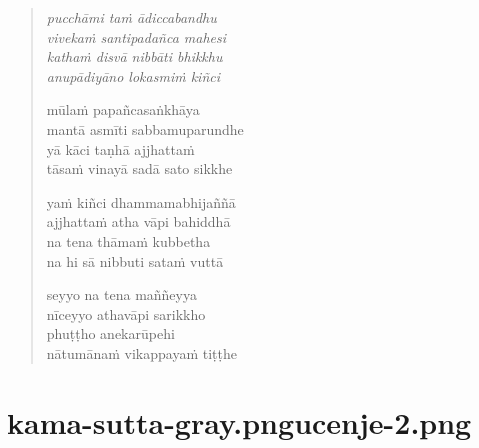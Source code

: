 

\cleartoverso

\vspace*{30mm}

\begin{verse}

\emph{pucchāmi taṁ ādiccabandhu\\
vivekaṁ santipadañca mahesi}\\
\emph{kathaṁ disvā nibbāti bhikkhu\\
anupādiyāno lokasmiṁ kiñci}

mūlaṁ papañcasaṅkhāya\\
mantā asmīti sabbamuparundhe\\
yā kāci taṇhā ajjhattaṁ\\
tāsaṁ vinayā sadā sato sikkhe

yaṁ kiñci dhammamabhijaññā\\
ajjhattaṁ atha vāpi bahiddhā\\
na tena thāmaṁ kubbetha\\
na hi sā nibbuti sataṁ vuttā

seyyo na tena maññeyya\\
nīceyyo athavāpi sarikkho\\
phuṭṭho anekarūpehi\\
nātumānaṁ vikappayaṁ tiṭṭhe

\end{verse}


\chapter[Tuvaṭaka Sutta]{{kama-sutta-gray.png}{ucenje-2.png}}


